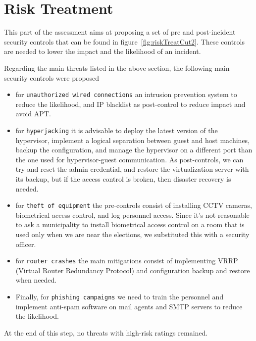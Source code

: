 \section*{Risk Treatment}

This part of the assessment aims at proposing a set of pre and post-incident security controls that can be found in figure~\ref{fig:riskTreatCut2}. These controls are needed to lower the impact and the likelihood of an incident.

Regarding the main threats listed in the above section, the following main security controls were proposed

\begin{itemize}
    \item for \texttt{unauthorized wired connections} an intrusion prevention system to reduce the likelihood, and IP blacklist as post-control to reduce impact and avoid APT.
    \item for \texttt{hyperjacking} it is advisable to deploy the latest version of the hypervisor, implement a logical separation between guest and host machines, backup the configuration, and manage the hypervisor on a different port than the one used for hypervisor-guest communication\cite{online:virtualSec}. As post-controls, we can try and reset the admin credential, and restore the virtualization server with its backup, but if the access control is broken, then disaster recovery is needed.
    \item for \texttt{theft of equipment} the pre-controls consist of installing CCTV cameras, biometrical access control, and log personnel access. Since it's not reasonable to ask a municipality to install biometrical access control on a room that is used only when we are near the elections, we substituted this with a security officer.\cite{online:roomSec}
    \item for \texttt{router crashes} the main mitigations consist of implementing VRRP (Virtual Router Redundancy Protocol) \cite{online:VRRP} and configuration backup and restore when needed.
    \item Finally, for \texttt{phishing campaigns} we need to train the personnel and implement anti-spam software on mail agents and SMTP servers to reduce the likelihood.
\end{itemize}


At the end of this step, no threats with high-risk ratings remained.\\

